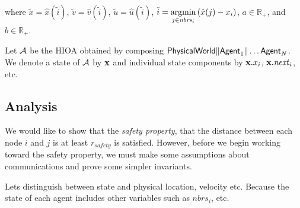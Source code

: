 \documentclass[10pt, conference, compsocconf]{IEEEtran}
\begin{document}
where $\tilde{x} = \hat{x}(\tilde{i})$, $\tilde{v} = \hat{v}(\tilde{i})$, $\tilde{u} = \hat{u}(\tilde{i})$, $\tilde{i} = \argmin{\left(\hat{x}(j) - x_i\right)}{j \in \mathit{nbrs}_i}$, $a \in \mathbb{R}_+$, and $b \in \mathbb{R}_+$.

Let $\A$ be the HIOA obtained by composing 
$\auto{PhysicalWorld} \| \auto{Agent}_1 \| \ldots \auto{Agent}_N$.
We denote a state of $\A$ by $\vx$ and individual 
state components by $\vx.x_i$, $\vx.\mathit{next}_i$, etc.
%

\subsection{Analysis}
\label{sec:flockana}

We would like to show that the \textit{safety property}, that the distance between each node $i$ and $j$ is at least $\mathit{r_{safety}}$ is satisfied.  However, before we begin working toward the safety property, we must make some assumptions about communications and prove some simpler invariants.

Lets distinguish between state and physical location, velocity etc. Because the state of each agent includes other variables such as $\mathit{nbrs}_i$, etc.
\end{document}
